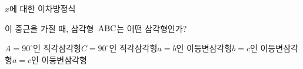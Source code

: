 $x$에 대한 이차방정식\par\smallskip{}\par\smallskip\noindent 이 중근을 가질 때, 삼각형~$\mathrm{ABC}$는 어떤 삼각형인가?
\begin{choicesv}{$A=90^\circ$인 직각삼각형}{$C=90^\circ$인 직각삼각형}{$a=b$인 이등변삼각형}{$b=c$인 이등변삼각형}{$a=c$인 이등변삼각형}\end{choicesv}
